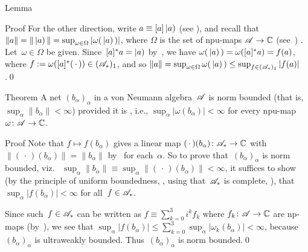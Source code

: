 \documentclass[a]{subfiles}
\begin{document}
\begin{parsec}
\begin{point}{Lemma}
\begin{point}{Proof}
For the other direction,
write $a\equiv [a] \left|a\right)$ (see ),
and recall that $\|a\|=\|\left|a\right)\|=\sup_{\omega\in \Omega} 
\left|\omega (\,\left|a\right)\,)\right|$,
where $\Omega$ is the set of  npu-maps $\mathscr{A}\to \mathbb{C}$
(see~\TODO{}) .
Let~$\omega\in \Omega$ be given.
Since~$[a]^*a=\left|a\right)$ by~\TODO{},
we have $\omega(\,\left|a\right)\,)=\omega([a]^*a)=f(a)$,
where $f:=\omega([a]^*(\,\cdot\,))\in (\mathscr{A}_*)_1$,
and so $\|a\|=\sup_{\omega\in\Omega} 
\omega(\,\left|a\right)\,) \leq \sup_{f\in (\mathscr{A}_*)_1}
\left|f(a)\right|$.\qed
\end{point}
\end{point}
\begin{point}{Theorem}%
A net  $(b_\alpha)_\alpha$
 in a von Neumann algebra~$\mathscr{A}$
is norm bounded
(that is,~$\sup_\alpha \|b_\alpha\|<\infty$)
provided it is , i.e.,
$\sup_\alpha \left|\omega(b_\alpha)\right|<\infty$
for every npu-map $\omega\colon \mathscr{A}\to \mathbb{C}$.
\begin{point}{Proof}%
Note that $f\mapsto f(b_\alpha)$
gives a linear map $(\,\cdot\,)(b_\alpha)\colon \mathscr{A}_*\to\mathbb{C}$
with $\|(\,\cdot\,)(b_\alpha)\|=\|b_\alpha\|$ 
by~
for each~$\alpha$.
So to prove that~$(b_\alpha)_\alpha$
is norm bounded, viz.~%
$\sup_\alpha \|b_\alpha\|\equiv \sup_\alpha \|(\,\cdot\,)(b_\alpha)\|<\infty$,
it suffices to show
(by the principle of uniform boundedness, ,
using that~$\mathscr{A}_*$ is complete, ),
that $\sup_\alpha \left|f(b_\alpha)\right|<\infty$ for all~$f\in\mathscr{A}_*$.

Since such~$f\in\mathscr{A}_*$
can be written as $f\equiv \sum_{k=0}^3 i^k f_k$
where $f_k\colon \mathscr{A}\to\mathbb{C}$ are np-maps
(by~),
we see that $\sup_\alpha\left|f(b_\alpha)\right|
\leq \sum_{k=0}^3\sup_\alpha \left|\omega_k(b_\alpha)\right|
<\infty$, because~$(b_\alpha)_\alpha$
is ultraweakly bounded.
Thus~$(b_\alpha)_\alpha$
is norm bounded.\qed
\end{point}
\end{point}
\end{parsec}
\end{document}
